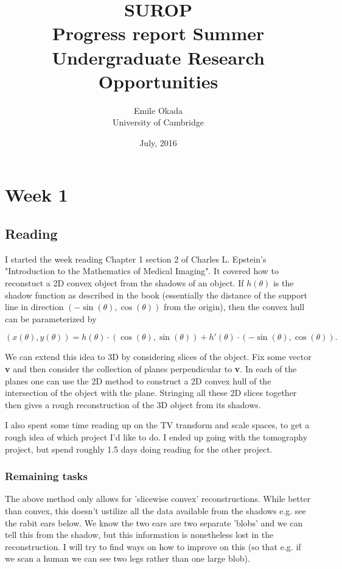 \documentclass[a4paper]{article}
\begin{document}
\title{
    SUROP \\ Progress report
}
\title{Summer Undergraduate Research Opportunities}
\date{July, 2016}
\author{Emile Okada \\ University of Cambridge}
\maketitle

\newpage

\setcounter{section}{0}
\section{Week 1}
\subsection{Reading}
I started the week reading Chapter 1 section 2 of Charles L. Epstein's "Introduction to the Mathematics of Medical Imaging".
It covered how to reconstuct a 2D convex object from the shadows of an object. 
If $h(\theta)$ is the shadow function as described in the book (essentially the distance of the support line in direction $(-\sin(\theta),\cos(\theta))$ from the origin), then the convex hull can be parameterized by

\begin{equation}
    (x(\theta),y(\theta)) = h(\theta)\cdot(\cos(\theta),\sin(\theta))+h'(\theta)\cdot(-\sin(\theta),\cos(\theta)).
\end{equation}

We can extend this idea to 3D by considering slices of the object. 
Fix some vector {\bfseries v} and then consider the collection of planes perpendicular to {\bfseries v}. 
In each of the planes one can use the 2D method to construct a 2D convex hull of the intersection of the object with the plane. 
Stringing all these 2D slices together then gives a rough reconstruction of the 3D object from its shadows.

I also spent some time reading up on the TV transform and scale spaces, to get a rough idea of which project I'd like to do. 
I ended up going with the tomography project, but spend roughly 1.5 days doing reading for the other project.

\subsubsection{Remaining tasks}
The above method only allows for 'slicewise convex' reconstructions. While better than convex, this doesn't ustilize all the data available from the shadows e.g. see the rabit ears below. We know the two ears are two separate 'blobs' and we can tell this from the shadow, but this information is nonetheless lost in the reconstruction. I will try to find ways on how to improve on this (so that e.g. if we scan a human we can see two legs rather than one large blob).
\end{document}

